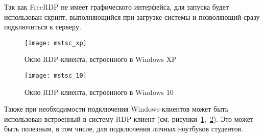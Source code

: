 Так как FreeRDP не имеет графического интерфейса, для запуска будет использован скрипт,
выполняющийся при загрузке системы и позволяющий сразу подключиться к серверу. 

\begin{figure}[h]
    \center
    \texttt{[image: mstsc\_xp]}
    \caption{Окно RDP-клиента, встроенного в Windows XP}
    \label{pic:mstsc_xp}
\end{figure}

\begin{figure}[h]
    \center
    \texttt{[image: mstsc\_10]}
    \caption{Окно RDP-клиента, встроенного в Windows 10}
    \label{pic:mstsc_10}
\end{figure}

Также при необходимости подключения Windows-клиентов может быть использован встроенный в
систему RDP-клиент (см. рисунки~\ref{pic:mstsc_xp},~\ref{pic:mstsc_10}). Это может быть
полезным, в том числе, для подключения личных ноутбуков студентов.
